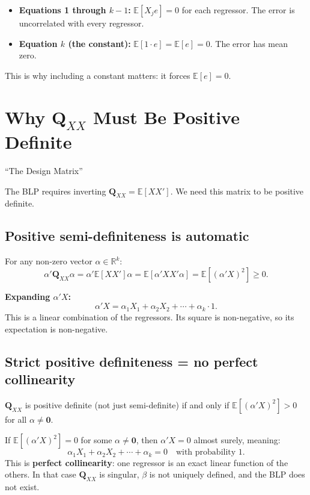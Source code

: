\documentclass[12pt]{article}
\newcommand{\E}{\mathbb{E}}
\newcommand{\bfQ}{\mathbf{Q}}
\theoremstyle{definition}
\begin{document}
\begin{itemize}
\item \textbf{Equations 1 through $k{-}1$:} $\E[X_j e] = 0$ for each regressor. The error is uncorrelated with every regressor.
\item \textbf{Equation $k$ (the constant):} $\E[1 \cdot e] = \E[e] = 0$. The error has mean zero.
\end{itemize}

This is why including a constant matters: it forces $\E[e] = 0$.


\section{Why $\bfQ_{XX}$ Must Be Positive Definite}
\label{sec:pd}

\begin{tcolorbox}[colback=blue!5, colframe=blue!50, title=Slide Reference]
``The Design Matrix''
\end{tcolorbox}

The BLP requires inverting $\bfQ_{XX} = \E[XX']$. We need this matrix to be positive definite.

\subsection{Positive semi-definiteness is automatic}

For any non-zero vector $\alpha \in \mathbb{R}^k$:
\[
\alpha'\bfQ_{XX}\alpha = \alpha'\E[XX']\alpha = \E[\alpha'XX'\alpha] = \E[(\alpha'X)^2] \geq 0.
\]

\textbf{Expanding $\alpha'X$:}
\[
\alpha'X = \alpha_1 X_1 + \alpha_2 X_2 + \cdots + \alpha_k \cdot 1.
\]
This is a linear combination of the regressors. Its square is non-negative, so its expectation is non-negative.

\subsection{Strict positive definiteness = no perfect collinearity}

$\bfQ_{XX}$ is positive definite (not just semi-definite) if and only if $\E[(\alpha'X)^2] > 0$ for all $\alpha \neq \mathbf{0}$.

If $\E[(\alpha'X)^2] = 0$ for some $\alpha \neq \mathbf{0}$, then $\alpha'X = 0$ almost surely, meaning:
\[
\alpha_1 X_1 + \alpha_2 X_2 + \cdots + \alpha_k = 0 \quad \text{with probability 1}.
\]
This is \textbf{perfect collinearity}: one regressor is an exact linear function of the others. In that case $\bfQ_{XX}$ is singular, $\beta$ is not uniquely defined, and the BLP does not exist.
\end{document}
